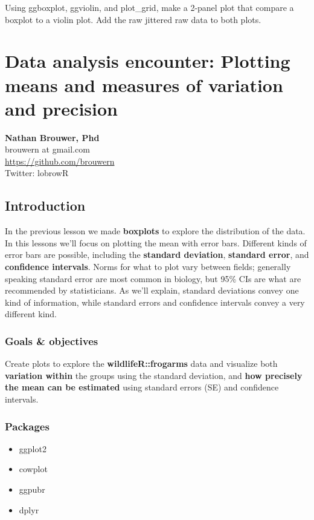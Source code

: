 \documentclass[]{book}
\providecommand{\tightlist}{%
  \setlength{\itemsep}{0pt}\setlength{\parskip}{0pt}}
\theoremstyle{definition}
\theoremstyle{definition}
\theoremstyle{definition}
\theoremstyle{remark}
\begin{document}
Using ggboxplot, ggviolin, and plot\_grid, make a 2-panel plot that
compare a boxplot to a violin plot. Add the raw jittered raw data to
both plots.

\chapter{Data analysis encounter: Plotting means and measures of
variation and
precision}\label{data-analysis-encounter-plotting-means-and-measures-of-variation-and-precision}

\textbf{Nathan Brouwer, Phd}\\
brouwern at gmail.com\\
\url{https://github.com/brouwern}\\
Twitter: lobrowR

\section{Introduction}\label{introduction-10}

In the previous lesson we made \textbf{boxplots} to explore the
distribution of the data. In this lessons we'll focus on plotting the
mean with error bars. Different kinds of error bars are possible,
including the \textbf{standard deviation}, \textbf{standard error}, and
\textbf{confidence intervals}. Norms for what to plot vary between
fields; generally speaking standard error are most common in biology,
but 95\% CIs are what are recommended by statisticians. As we'll
explain, standard deviations convey one kind of information, while
standard errors and confidence intervals convey a very different kind.

\subsection{Goals \& objectives}\label{goals-objectives-1}

Create plots to explore the \textbf{wildlifeR::frogarms} data and
visualize both \textbf{variation within} the groups using the standard
deviation, and \textbf{how precisely the mean can be estimated} using
standard errors (SE) and confidence intervals.

\subsection{Packages}\label{packages-9}

\begin{itemize}
\tightlist
\item
  ggplot2
\item
  cowplot
\item
  ggpubr
\item
  dplyr
\end{itemize}
\end{document}
